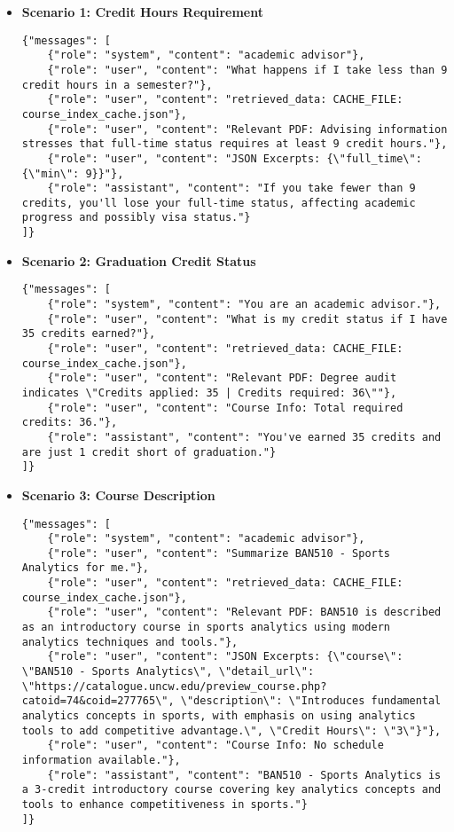 \documentclass[12pt,oneside,openany]{report}
\begin{document}
\begin{itemize}

\item \textbf{Scenario 1: Credit Hours Requirement}
\begin{lstlisting}[breaklines=true]
{"messages": [
    {"role": "system", "content": "academic advisor"},
    {"role": "user", "content": "What happens if I take less than 9 credit hours in a semester?"},
    {"role": "user", "content": "retrieved_data: CACHE_FILE: course_index_cache.json"},
    {"role": "user", "content": "Relevant PDF: Advising information stresses that full-time status requires at least 9 credit hours."},
    {"role": "user", "content": "JSON Excerpts: {\"full_time\": {\"min\": 9}}"},
    {"role": "assistant", "content": "If you take fewer than 9 credits, you'll lose your full-time status, affecting academic progress and possibly visa status."}
]}
\end{lstlisting}

\item \textbf{Scenario 2: Graduation Credit Status}
\begin{lstlisting}[breaklines=true]
{"messages": [
    {"role": "system", "content": "You are an academic advisor."},
    {"role": "user", "content": "What is my credit status if I have 35 credits earned?"},
    {"role": "user", "content": "retrieved_data: CACHE_FILE: course_index_cache.json"},
    {"role": "user", "content": "Relevant PDF: Degree audit indicates \"Credits applied: 35 | Credits required: 36\""},
    {"role": "user", "content": "Course Info: Total required credits: 36."},
    {"role": "assistant", "content": "You've earned 35 credits and are just 1 credit short of graduation."}
]}
\end{lstlisting}

\item \textbf{Scenario 3: Course Description}
\begin{lstlisting}[breaklines=true]
{"messages": [
    {"role": "system", "content": "academic advisor"},
    {"role": "user", "content": "Summarize BAN510 - Sports Analytics for me."},
    {"role": "user", "content": "retrieved_data: CACHE_FILE: course_index_cache.json"},
    {"role": "user", "content": "Relevant PDF: BAN510 is described as an introductory course in sports analytics using modern analytics techniques and tools."},
    {"role": "user", "content": "JSON Excerpts: {\"course\": \"BAN510 - Sports Analytics\", \"detail_url\": \"https://catalogue.uncw.edu/preview_course.php?catoid=74&coid=277765\", \"description\": \"Introduces fundamental analytics concepts in sports, with emphasis on using analytics tools to add competitive advantage.\", \"Credit Hours\": \"3\"}"},
    {"role": "user", "content": "Course Info: No schedule information available."},
    {"role": "assistant", "content": "BAN510 - Sports Analytics is a 3-credit introductory course covering key analytics concepts and tools to enhance competitiveness in sports."}
]}
\end{lstlisting}


\end{itemize}
\end{document}
